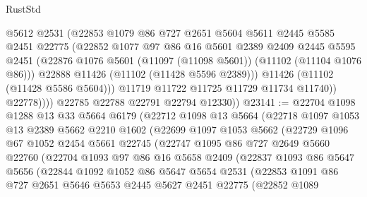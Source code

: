 \begin{lexlean}{RustStd}
\begin{coremodule}
                    @5612
                    @2531
                    (@22853
                      @1079
                      @86
                      @727
                      @2651
                      @5604
                      @5611
                      @2445
                      @5585
                      @2451
                      @22775
                      (@22852
                        @1077
                        @97
                        @86
                        @16
                        @5601
                        @2389
                        @2409
                        @2445
                        @5595
                        @2451
                        (@22876 @1076 @5601 (@11097 (@11098 @5601)) (@11102 (@11104 @1076 @86)))
                        @22888
                        @11426
                        (@11102 (@11428 @5596 @2389)))
                      @11426
                      (@11102 (@11428 @5586 @5604)))
                    @11719
                    @11722
                    @11725
                    @11729
                    @11734
                    @11740))
                @22778))))
        @22785
        @22788
        @22791
        @22794
        @12330))
@23141 := @22704
    @1098
    @1288
    @13
    @33
    @5664
    @6179
    (@22712
      @1098
      @13
      @5664
      (@22718
        @1097
        @1053
        @13
        @2389
        @5662
        @2210
        @1602
        (@22699
          @1097
          @1053
          @5662
          (@22729
            @1096
            @67
            @1052
            @2454
            @5661
            @22745
            (@22747
              @1095
              @86
              @727
              @2649
              @5660
              @22760
              (@22704
                @1093
                @97
                @86
                @16
                @5658
                @2409
                (@22837
                  @1093
                  @86
                  @5647
                  @5656
                  (@22844
                    @1092
                    @1052
                    @86
                    @5647
                    @5654
                    @2531
                    (@22853
                      @1091
                      @86
                      @727
                      @2651
                      @5646
                      @5653
                      @2445
                      @5627
                      @2451
                      @22775
                      (@22852
                        @1089

\end{coremodule}
\end{lexlean}
